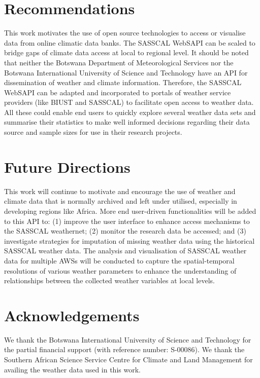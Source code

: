 \documentclass[a4paper, 10pt, conference]{ieeeconf}      %
\begin{document}
\section{Recommendations}
\label{Reco}
\noindent
This work motivates the use of  open source technologies to access or visualise data from online climatic data banks.  
The SASSCAL WebSAPI can be scaled to  bridge gaps  of climate data access at local to regional   level. It should be noted that neither the Botswana Department of Meteorological Services nor the Botswana International University of Science and Technology have an API for dissemination of weather and climate information.    Therefore, the SASSCAL WebSAPI  can be adapted and incorporated to portals of weather service providers (like BIUST and SASSCAL) to facilitate open access to weather data.
All these could enable end users to  quickly explore 	several weather data sets and  summarise their statistics to make well informed decisions regarding their data source and sample sizes for use in their 	research projects.

	
\section{Future Directions}
\label{Futuro}
\noindent
This work  will continue to motivate and encourage the use of weather and climate data that is normally archived and left under utilised, especially in developing regions like Africa. 
More end user-driven functionalities will be added to this API to: (1) improve the user interface to enhance access mechanisms to the SASSCAL weathernet; (2)  monitor the research data be accessed; and (3)  investigate strategies for imputation of missing weather data using the historical  SASSCAL weather data. The analysis and visualisation of SASSCAL weather data for multiple AWSs will be conducted to capture the spatial-temporal resolutions of various weather parameters   to enhance the understanding of relationships between the collected weather variables at local levels.
 
	\section*{Acknowledgements}
	\noindent
We thank the Botswana International University of Science and Technology for the partial financial support (with reference number: S-00086).	We thank  %
 the Southern   African   Science   Service   Centre for  Climate  and  Land  Management    for availing the weather data used in this work.
\end{document}
